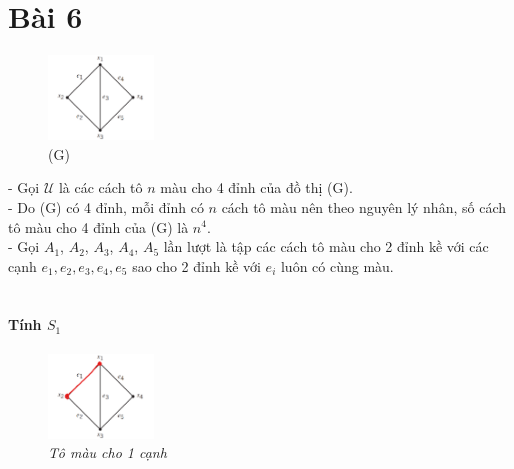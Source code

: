 \documentclass[main.tex]{subfiles}
\begin{document}
\section{Bài 6}

\newcommand{\U}{\ensuremath{\mathcal U} }
\newcommand{\A}[1]{\ensuremath{A_{#1}}}
\newcommand{\x}[1]{\ensuremath{x_{#1}}}
\newcommand{\abs}[1]{\ensuremath{\left|#1\right|}}
\newcommand{\ssum}[3]{\sum_{#1}^{#2}{#3}}
\newcommand{\vv}{\dots}

\begin{figure}
\centering
\includegraphics[width=0.25\textwidth]{image/Bai6.png}
\captionsetup{labelformat=empty}
\caption{(G)}
\vspace*{-1cm}
\end{figure}

- Gọi \U là các cách tô $n$ màu cho 4 đỉnh của đồ thị (G).\\
- Do (G) có 4 đỉnh, mỗi đỉnh có $n$ cách tô màu nên theo nguyên lý nhân, số cách tô màu cho 4 đỉnh của (G) là $n^4$.\\
- Gọi \A 1, \A 2, \A 3, \A 4, \A 5 lần lượt là tập các cách tô màu cho 2 đỉnh kề với các cạnh $e_1, e_2, e_3, e_4, e_5$ sao cho 2 đỉnh kề với $e_i$ luôn có cùng màu.\\ \\

\paragraph*{Tính $S_1$}
\begin{figure}
\centering
\vspace*{-1cm}
\includegraphics[width=0.25\textwidth]{image/Bai6_S1.png}
\captionsetup{labelformat=empty}
\caption{\textit{Tô màu cho 1 cạnh}}
\vspace*{-1cm}
\end{figure}
\end{document}
